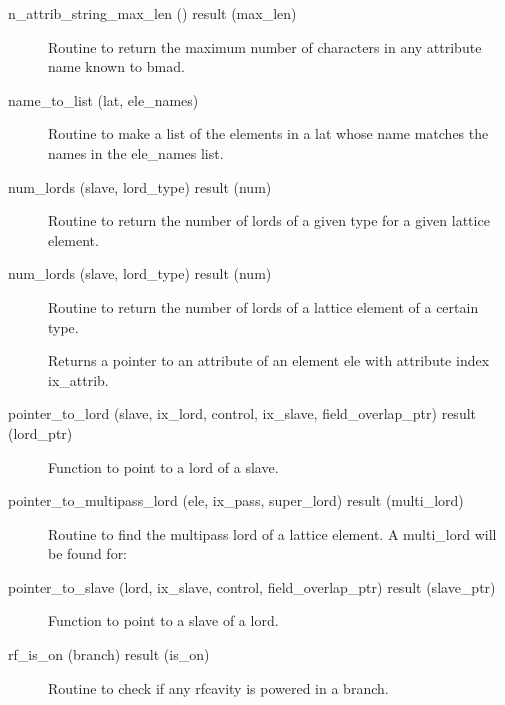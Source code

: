 \begin{description}
\label{r:n.attrib.string.max.len}
\item[n_attrib_string_max_len () result (max_len)] \Newline 
Routine to return the maximum number of characters in any attribute
name known to bmad.

\label{r:name.to.list}
\item[name_to_list (lat, ele_names)] \Newline
Routine to make a list of the elements in a lat 
whose name matches the names in the ele_names list. 

\label{r:num.lords}
\item[num_lords (slave, lord_type) result (num)] \Newline 
Routine to return the number of lords of a given type for a given lattice element.

\item[num_lords (slave, lord_type) result (num)] \Newline 
Routine to return the number of lords of a lattice element of a certain type.

\label{r:pointer.to.indexed.attribute}
\item[\protect\parbox{6in}{
  pointer_to_indexed_attribute (ele, ix_attrib, do_allocation, \\
  \hspace*{1in} a_ptr, err_flag, err_print_flag)} ] \Newline 
Returns a pointer to an attribute of an element ele with attribute index ix_attrib.

\label{r:pointer.to.lord}
\item[pointer_to_lord (slave, ix_lord, control, ix_slave, field_overlap_ptr) result (lord_ptr)] \Newline 
Function to point to a lord of a slave.

\label{r:pointer.to.multipass.lord}
\item[pointer_to_multipass_lord (ele, ix_pass, super_lord) result (multi_lord)] \Newline 
Routine to find the multipass lord of a lattice element.
A multi_lord will be found for:

\label{r:pointer.to.slave}
\item[pointer_to_slave (lord, ix_slave, control, field_overlap_ptr) result (slave_ptr)] \Newline 
Function to point to a slave of a lord.

\label{r:rf.is.on}
\item[rf_is_on (branch) result (is_on)] \Newline 
Routine to check if any rfcavity is powered in a branch.


\end{description}
